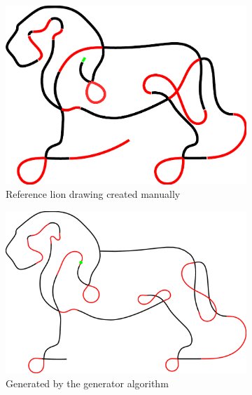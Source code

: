 \begin{figure}[h]
\begin{subfigure}[t]{0.45\textwidth}
	\includegraphics[width=\textwidth]{images/results/lion/lion_handmade.pdf}
	\caption{Reference lion drawing created manually}
\end{subfigure}
\begin{subfigure}[t]{0.45\textwidth}
	\includegraphics[width=\textwidth]{images/results/lion/lion_generated_22.pdf}
	\caption{Generated by the generator algorithm}
\end{subfigure}
\par\bigskip %
\begin{subfigure}[t]{0.45\textwidth}

\end{subfigure}
\end{figure}
